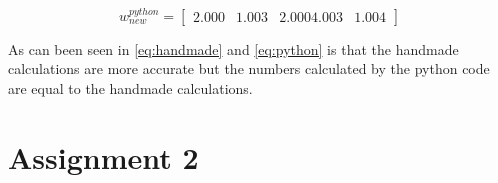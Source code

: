 \documentclass[a4paper,12pt]{article}
\begin{document}
\begin{equation}
w_{new}^{python}=
\begin{bmatrix} 2.000 &   1.003 & 2.000    4.003 & 1.004
\end{bmatrix}
\label{eq:python}
\end{equation}

As can been seen in \ref{eq:handmade} and \ref{eq:python} is that the handmade calculations are more accurate but the numbers calculated by the python code are equal to the handmade calculations. 


\section{Assignment 2}


%
\end{document}
